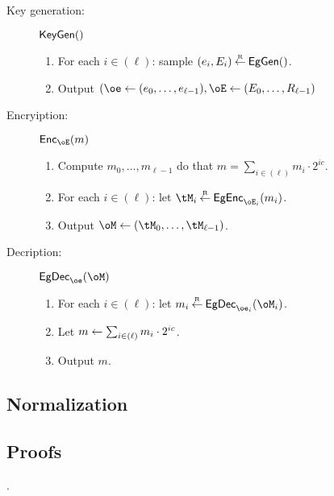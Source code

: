 \begin{description}
	\item[Key generation:] $\mathsf{KeyGen}()$ 
	\begin{enumerate}
		\item For each $i\in (\ell)$:	sample $(e_i,E_i) \mathbin{\stackrel{\mbox{\tiny R}}{\leftarrow}} \mathsf{EgGen}()$.
		
		\item Output $(\oe \asn (e_0,\ldots,e_{\ell-1}),\oE \asn (E_0,\ldots,R_{\ell-1})$
	\end{enumerate}

	
	\item[Encryiption:] $\Enc_{\oE}(m)$
	
	\begin{enumerate}
		\item Compute $m_0,\ldots,m_{\ell-1}$ do that $m =  \sum_{i \in (\ell)}   m_i \cdot 2^{i c}$.
		\item For each $i\in (\ell)$: let $\tM_i \getsr \EgEnc_{\oE_i}(m_i)$.
		
		\item Output $\oM \asn (\tM_0,\ldots, \tM_{\ell-1})$.
		
	\end{enumerate}
	 
	\item[Decription:] $\EgDec_{\oe}(\oM)$   
	\begin{enumerate}
		\item 	 For each $i\in (\ell)$: let $m_i \getsr \EgDec_{\oe_i}(\oM_i)$.
		
		\item Let  $m \leftarrow \sum_{i \in (\ell)}   m_i \cdot 2^{i c}$.
		
		\item Output $m$.
	\end{enumerate}
\end{description}



\subsection{Normalization}\label{sec:ChanksEG:Normalization}

\subsection{Proofs}\label{sec:ChanksEG:Proofs}

.